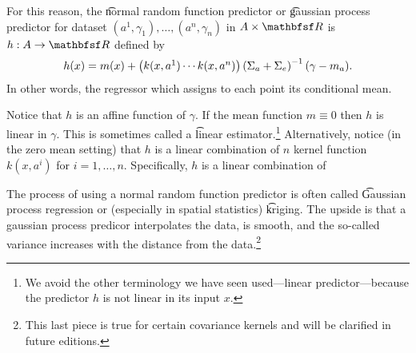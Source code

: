 For this reason, the \t{normal random function predictor} or \t{gaussian process predictor} for dataset $(a^1, \gamma _1), \dots , (a^n, \gamma _n)$ in $A \times \R $ is $h: A \to \R $ defined by
    \[
h(x) = m(x) + \begin{pmatrix}k(x,a^1) \cdots k(x, a^n)\end{pmatrix}\left(\Sigma _{a} + \Sigma _{e}\right)^{-1}(\gamma  - m_{a}).
    \]
In other words, the regressor which assigns to each point its conditional mean.

Notice that $h$ is an affine function of $\gamma $.
If the mean function $m \equiv 0$ then $h$ is linear in $\gamma $.
This is sometimes called a \t{linear estimator}.\footnote{We avoid the other terminology we have seen used---linear predictor---because the predictor $h$ is not linear in its input $x$.}
Alternatively, notice (in the zero mean setting) that $h$ is a linear combination of $n$ kernel function $k(x, a^i)$ for $i = 1, \dots , n$.
Specifically, $h$ is a linear combination of

The process of using a normal random function predictor is often called \t{Gaussian process regression} or (especially in spatial statistics) \t{kriging}.
The upside is that a gaussian process predicor interpolates the data, is smooth, and the so-called variance increases with the distance from the data.\footnote{This last piece is true for certain covariance kernels and will be clarified in future editions.}
